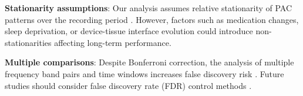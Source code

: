 \textbf{Stationarity assumptions}: Our analysis assumes relative stationarity of PAC patterns over the recording period \cite{Rakowska2021LongTEQ}. However, factors such as medication changes, sleep deprivation, or device-tissue interface evolution could introduce non-stationarities affecting long-term performance.

\textbf{Multiple comparisons}: Despite Bonferroni correction, the analysis of multiple frequency band pairs and time windows increases false discovery risk \cite{Jensen2016DiscriminatingVFR,Aru2014UntanglingCCD}. Future studies should consider false discovery rate (FDR) control methods \cite{PintoOrellana2023StatisticalIFF}.










